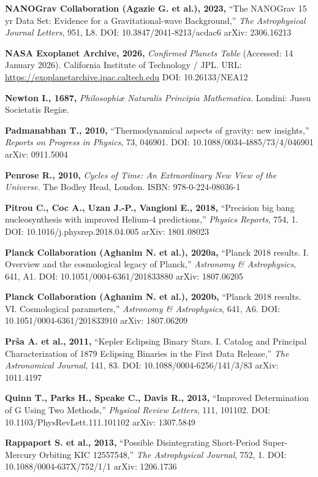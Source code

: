 \documentclass[11pt,a4paper]{article}
\begin{document}
\textbf{NANOGrav Collaboration (Agazie G. et al.), 2023,} ``The NANOGrav
15 yr Data Set: Evidence for a Gravitational-wave Background,''
\emph{The Astrophysical Journal Letters}, 951, L8. DOI:
10.3847/2041-8213/acdac6 arXiv: 2306.16213

\textbf{NASA Exoplanet Archive, 2026,} \emph{Confirmed Planets Table}
(Accessed: 14 January 2026). California Institute of Technology / JPL.
URL: \url{https://exoplanetarchive.ipac.caltech.edu} DOI: 10.26133/NEA12

\textbf{Newton I., 1687,} \emph{Philosophiæ Naturalis Principia
Mathematica}. Londini: Jussu Societatis Regiæ.

\textbf{Padmanabhan T., 2010,} ``Thermodynamical aspects of gravity: new
insights,'' \emph{Reports on Progress in Physics}, 73, 046901. DOI:
10.1088/0034-4885/73/4/046901 arXiv: 0911.5004

\textbf{Penrose R., 2010,} \emph{Cycles of Time: An Extraordinary New
View of the Universe}. The Bodley Head, London. ISBN: 978-0-224-08036-1

\textbf{Pitrou C., Coc A., Uzan J.-P., Vangioni E., 2018,} ``Precision
big bang nucleosynthesis with improved Helium-4 predictions,''
\emph{Physics Reports}, 754, 1. DOI: 10.1016/j.physrep.2018.04.005
arXiv: 1801.08023

\textbf{Planck Collaboration (Aghanim N. et al.), 2020a,} ``Planck 2018
results. I. Overview and the cosmological legacy of Planck,''
\emph{Astronomy \& Astrophysics}, 641, A1. DOI:
10.1051/0004-6361/201833880 arXiv: 1807.06205

\textbf{Planck Collaboration (Aghanim N. et al.), 2020b,} ``Planck 2018
results. VI. Cosmological parameters,'' \emph{Astronomy \&
Astrophysics}, 641, A6. DOI: 10.1051/0004-6361/201833910 arXiv:
1807.06209

\textbf{Prša A. et al., 2011,} ``Kepler Eclipsing Binary Stars. I.
Catalog and Principal Characterization of 1879 Eclipsing Binaries in the
First Data Release,'' \emph{The Astronomical Journal}, 141, 83. DOI:
10.1088/0004-6256/141/3/83 arXiv: 1011.4197

\textbf{Quinn T., Parks H., Speake C., Davis R., 2013,} ``Improved
Determination of G Using Two Methods,'' \emph{Physical Review Letters},
111, 101102. DOI: 10.1103/PhysRevLett.111.101102 arXiv: 1307.5849

\textbf{Rappaport S. et al., 2013,} ``Possible Disintegrating
Short-Period Super-Mercury Orbiting KIC 12557548,'' \emph{The
Astrophysical Journal}, 752, 1. DOI: 10.1088/0004-637X/752/1/1 arXiv:
1206.1736
\end{document}
